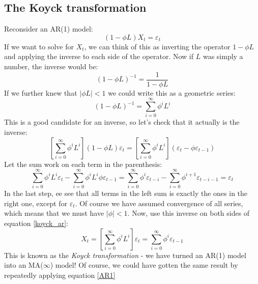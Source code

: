 \documentclass[12pt, a4paper]{article}
\numberwithin{equation}{section}
\begin{document}
\subsection{The Koyck transformation}
Reconsider an AR(1) model:
\begin{equation}
\label{koyck_ar}
(1-\phi L)X_t=\varepsilon_t
\end{equation}
If we want to solve for $X_t$, we can think of this as inverting the operator $1-\phi L$ and applying the inverse to each side of the operator. Now if $L$ was simply a number, the inverse would be:
\begin{equation}
(1-\phi L)^{-1}=\frac{1}{1-\phi L}
\end{equation}
If we further knew that $|\phi L|<1$ we could write this as a geometric series:
\begin{equation}
(1-\phi L)^{-1}=\sum_{i=0}^\infty\phi^i L^i
\end{equation}
This is a good candidate for an inverse, so let's check that it actually is the inverse:
\begin{equation}
\left[\sum_{i=0}^\infty\phi^i L^i\right](1-\phi L)\varepsilon_t=\left[\sum_{i=0}^\infty\phi^i L^i\right](\varepsilon_t-\phi\varepsilon_{t-1})
\end{equation}
Let the sum work on each term in the parenthesis:
\begin{equation}
\sum_{i=0}^\infty\phi^i L^i\varepsilon_t-\sum_{i=0}^\infty\phi^{i} L^i\phi\varepsilon_{t-1}=\sum_{i=0}^\infty\phi^i\varepsilon_{t-i}-\sum_{i=0}^\infty\phi^{i+1}\varepsilon_{t-i-1}=\varepsilon_t
\end{equation}
In the last step, ee see that all terms in the left sum is exactly the ones in the right one, except for $\varepsilon_t$. Of course we have assumed convergence of all series, which means that we must have $|\phi|<1$. Now, use this inverse on both sides of equation \ref{koyck_ar}:
\begin{equation}
X_t=\left[\sum_{i=0}^\infty\phi^i L^i\right]\varepsilon_t=\sum_{i=0}^\infty\phi^i\varepsilon_{t-1}
\end{equation}
This is known as the \textit{Koyck transformation} - we have turned an AR(1) model into an MA($\infty$) model! Of course, we could have gotten the same result by repeatedly applying equation \ref{AR1}
\end{document}
